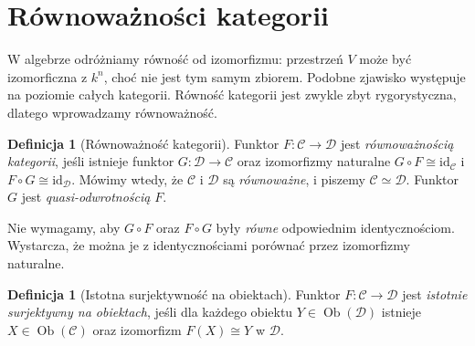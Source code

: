 \documentclass[11pt,a4paper]{article}
\numberwithin{equation}{section}
\theoremstyle{plain}
\theoremstyle{definition}
\newtheorem{definicja}[twierdzenie]{Definicja}
\theoremstyle{remark}
\newcommand{\id}{\mathrm{id}}
\newcommand{\Ob}{\operatorname{Ob}}
\begin{document}
\section{Równoważności kategorii}\label{sec:equivalence}

W algebrze odróżniamy równość od izomorfizmu: przestrzeń $V$ może być izomorficzna z $k^n$, choć nie jest tym samym zbiorem. Podobne zjawisko występuje na poziomie całych kategorii. Równość kategorii jest zwykle zbyt rygorystyczna, dlatego wprowadzamy równoważność.

\begin{definicja}[Równoważność kategorii]\label{def:equivalence}
Funktor $F:\mathcal C\to\mathcal D$ jest \emph{równoważnością kategorii}, jeśli istnieje funktor $G:\mathcal D\to\mathcal C$ oraz izomorfizmy naturalne $G\circ F\cong\id_{\mathcal C}$ i $F\circ G\cong\id_{\mathcal D}$. Mówimy wtedy, że $\mathcal C$ i $\mathcal D$ są \emph{równoważne}, i piszemy $\mathcal C\simeq\mathcal D$. Funktor $G$ jest \emph{quasi-odwrotnością} $F$.
\end{definicja}

Nie wymagamy, aby $G\circ F$ oraz $F\circ G$ były \emph{równe} odpowiednim identycznościom. Wystarcza, że można je z identycznościami porównać przez izomorfizmy naturalne.

\begin{definicja}[Istotna surjektywność na obiektach]
Funktor $F:\mathcal C\to\mathcal D$ jest \emph{istotnie surjektywny na obiektach}, jeśli dla każdego obiektu $Y\in\Ob(\mathcal D)$ istnieje $X\in\Ob(\mathcal C)$ oraz izomorfizm $F(X)\cong Y$ w $\mathcal D$.
\end{definicja}
\end{document}
